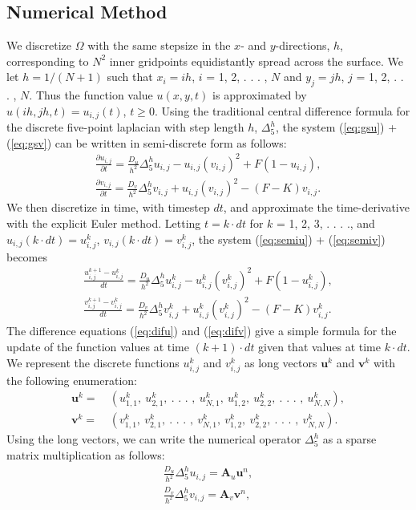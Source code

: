 \documentclass[a4paper,11pt]{article}
\newcommand{\ba}[1]{\begin{align*}    #1    \end{align*}}
\newcommand{\ban}[1]{\begin{align}    #1    \end{align}}
\renewcommand{\vec}[1]{\mathbf{#1}}
\begin{document}
\subsection*{Numerical Method}
We discretize $\Omega$ with the same stepsize in the $x$- and $y$-directions, $h$, corresponding to $N^2$ inner gridpoints equidistantly spread across the surface.  We let $h = 1/(N+1)$ such that $x_i = ih$, $i$ = 1, 2, . . . , $N$ and $y_j = jh$, $j$ = 1, 2, . . . , $N$.  Thus the function value $u(x,y,t)$ is approximated by $u(ih, jh, t) = u_{i,j}(t)$, $t\ge 0$. Using the traditional central difference formula for the discrete five-point laplacian with step length $h$, $\Delta_5^h$, the system (\ref{eq:gsu}) + (\ref{eq:gsv}) can be written in semi-discrete form as follows: 
\begingroup
\addtolength{\jot}{0.5 em}
\ban{
\label{eq:semiu}
\frac{\partial u_{i,j}}{\partial t} = \frac{D_u}{h^2} \Delta_5^h u_{i,j} -u_{i,j} (v_{i,j})^2 + F(1-u_{i,j}), \\
\label{eq:semiv}
\frac{\partial v_{i,j}}{\partial t} = \frac{D_v}{h^2} \Delta_5^h v_{i,j} +u_{i,j} (v_{i,j})^2 - (F-K)v_{i,j}.
}
\endgroup
We then discretize in time, with timestep $dt$, and approximate the time-derivative with the explicit Euler method.  Letting $t = k\cdot dt$ for $k$ = 1, 2, 3, . . . ., and $u_{i,j}(k\cdot dt) = u_{i,j}^k$, $v_{i,j}(k\cdot dt) = v_{i,j}^k$, the system (\ref{eq:semiu}) + (\ref{eq:semiv})  becomes
\begingroup
\addtolength{\jot}{0.5 em}
\ban{
\label{eq:difu}
\frac{u_{i,j}^{k+1} - u_{i,j}^k}{dt} = \frac{D_u}{h^2} \Delta_5^h u_{i,j}^k -u_{i,j}^k (v_{i,j}^k)^2 + F(1-u_{i,j}^k), \\
\label{eq:difv}
\frac{v_{i,j}^{k+1} - v_{i,j}^k}{dt} = \frac{D_v}{h^2} \Delta_5^h v_{i,j}^k +u_{i,j}^k (v_{i,j}^k)^2 - (F-K)v_{i,j}^k.
}
\endgroup
The difference equations (\ref{eq:difu}) and (\ref{eq:difv}) give a simple formula for the update of the function values at time $(k+1) \cdot dt$ given that values at time $k \cdot dt$.  We represent the discrete functions $u_{i,j}^k$ and  $v_{i,j}^k$ as long vectors $\vec{u}^k$ and $\vec{v}^k$ with the following enumeration:
\ba{
\vec{u}^k = & \ (u_{1,1}^k, \ u_{2,1}^k, \ \text{. . . }, \ u_{N,1}^k, \ u_{1,2}^k, \ u_{2,2}^k, \ \text{. . . }, \ u_{N,N}^k), \\
\vec{v}^k = & \ (v_{1,1}^k, \ v_{2,1}^k, \ \text{. . . }, \ v_{N,1}^k, \ v_{1,2}^k, \ v_{2,2}^k, \ \text{. . . }, \ v_{N,N}^k).
}
Using the long vectors, we can write the numerical operator $\Delta_5^h$ as a sparse matrix multiplication as follows:
\begingroup
\addtolength{\jot}{0.5 em}
\ba{
\frac{D_u}{h^2} \Delta_5^h u_{i,j} = \vec{A}_u\vec{u}^n,\\
\frac{D_v}{h^2} \Delta_5^h v_{i,j} = \vec{A}_v\vec{v}^n,
}
\end{document}
